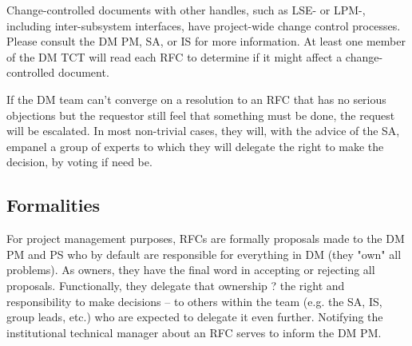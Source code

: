 Change-controlled documents with other handles, such as LSE- or LPM-, including inter-subsystem interfaces, have project-wide change control processes. Please consult the DM PM, SA, or IS for more information.
At least one member of the DM TCT will read each RFC to determine if it might affect a change-controlled document.

If the DM team can't converge on a resolution to an RFC that has no serious objections but the requestor still feel that something must be done, the request will be escalated. In most non-trivial cases, they will, with the advice of the SA, empanel a group of experts to which they will delegate the right to make the decision, by voting if need be.

\subsection{Formalities}
For project management purposes, RFCs are formally proposals made to the DM PM and PS who by default are responsible for everything in DM (they "own" all problems). As owners, they have the final word in accepting or rejecting all proposals. Functionally, they delegate that ownership ? the right and responsibility to make decisions -- to others within the team (e.g. the SA, IS, group leads, etc.) who are expected to delegate it even further. Notifying the institutional technical manager about an RFC serves to inform the DM PM.

